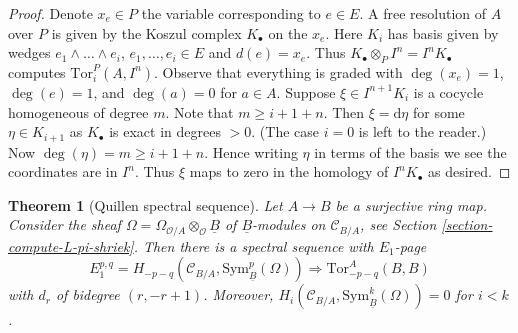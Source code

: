 \documentclass{stacks-project}
\theoremstyle{plain}
\newtheorem{theorem}[subsection]{Theorem}
\theoremstyle{definition}
\theoremstyle{remark}
\numberwithin{equation}{subsection}
\begin{document}
\begin{proof}
Denote $x_e \in P$ the variable corresponding to $e \in E$.
A free resolution of $A$ over $P$ is given by the Koszul complex
$K_\bullet$ on the $x_e$. Here $K_i$ has basis given by wedges
$e_1 \wedge \ldots \wedge e_i$, $e_1, \ldots, e_i \in E$ and $d(e) = x_e$.
Thus $K_\bullet \otimes_P I^n = I^nK_\bullet$ computes
$\text{Tor}_i^P(A, I^n)$. Observe that everything is graded
with $\deg(x_e) = 1$, $\deg(e) = 1$, and $\deg(a) = 0$ for $a \in A$.
Suppose $\xi \in I^{n + 1}K_i$ is a cocycle homogeneous of degree $m$.
Note that $m \geq i + 1 + n$. Then $\xi = \text{d}\eta$ for some
$\eta \in K_{i + 1}$ as $K_\bullet$ is exact in degrees $ > 0$.
(The case $i = 0$ is left to the reader.)
Now $\deg(\eta) = m \geq i + 1 + n$. Hence writing $\eta$
in terms of the basis we see the coordinates are in $I^n$.
Thus $\xi$ maps to zero in the homology of $I^nK_\bullet$ as desired.
\end{proof}

\begin{theorem}[Quillen spectral sequence]
\label{theorem-quillen-spectral-sequence}
Let $A \to B$ be a surjective ring map. Consider the sheaf
$\Omega = \Omega_{\mathcal{O}/A} \otimes_\mathcal{O} \underline{B}$ of
$\underline{B}$-modules on $\mathcal{C}_{B/A}$, see
Section \ref{section-compute-L-pi-shriek}.
Then there is a spectral sequence with $E_1$-page
$$
E_1^{p, q} =
H_{- p - q}(\mathcal{C}_{B/A}, \text{Sym}^p_{\underline{B}}(\Omega))
\Rightarrow \text{Tor}^A_{- p - q}(B, B)
$$
with $d_r$ of bidegree $(r, -r + 1)$.
Moreover, $H_i(\mathcal{C}_{B/A}, \text{Sym}^k_{\underline{B}}(\Omega)) = 0$
for $i < k$.
\end{theorem}
\end{document}
